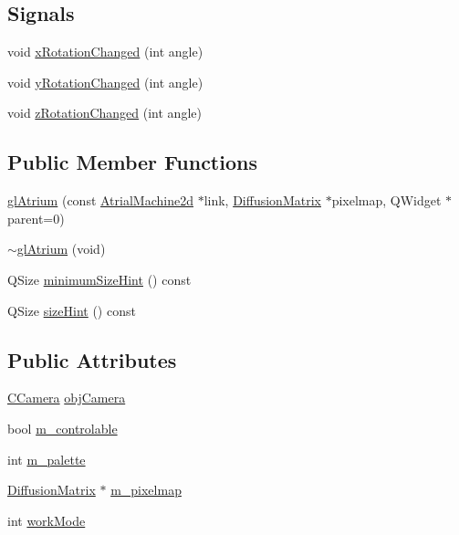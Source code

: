 \subsection*{Signals}
\begin{DoxyCompactItemize}
\item 
void \hyperlink{classgl_atrium_add3c45ba71308914e62ac5f07d9dbce4}{x\+Rotation\+Changed} (int angle)
\item 
void \hyperlink{classgl_atrium_a12abcdbba73ff41ea8efdbbdcdbdcb6c}{y\+Rotation\+Changed} (int angle)
\item 
void \hyperlink{classgl_atrium_a71703a9bcfb404b9aa1bdab789573c7e}{z\+Rotation\+Changed} (int angle)
\end{DoxyCompactItemize}
\subsection*{Public Member Functions}
\begin{DoxyCompactItemize}
\item 
\hyperlink{classgl_atrium_afddd34b3b58c74d8f6095796c766e80b}{gl\+Atrium} (const \hyperlink{class_atrial_machine2d}{Atrial\+Machine2d} $\ast$link, \hyperlink{class_diffusion_matrix}{Diffusion\+Matrix} $\ast$pixelmap, Q\+Widget $\ast$parent=0)
\item 
\hyperlink{classgl_atrium_aab01fe62e0f7734e3b91b42a11d32db7}{$\sim$gl\+Atrium} (void)
\item 
Q\+Size \hyperlink{classgl_atrium_acf3a401dfd3ca09d8dcb36886f306ba9}{minimum\+Size\+Hint} () const 
\item 
Q\+Size \hyperlink{classgl_atrium_a0e7fc813e7c9ae4d47317109815b9705}{size\+Hint} () const 
\end{DoxyCompactItemize}
\subsection*{Public Attributes}
\begin{DoxyCompactItemize}
\item 
\hyperlink{class_c_camera}{C\+Camera} \hyperlink{classgl_atrium_a5c68ba4ba236f29f3f96aded86daf029}{obj\+Camera}
\item 
bool \hyperlink{classgl_atrium_a3d9b6da1e18ad8b6125d64afde32c130}{m\+\_\+controlable}
\item 
int \hyperlink{classgl_atrium_afbce9f1a1572de51914bbf7b574c75ad}{m\+\_\+palette}
\item 
\hyperlink{class_diffusion_matrix}{Diffusion\+Matrix} $\ast$ \hyperlink{classgl_atrium_a594ad841f258f1a022dd813e29600f2e}{m\+\_\+pixelmap}
\item 
int \hyperlink{classgl_atrium_a7f57bee89c32d82bdadcb2ff8e5518a3}{work\+Mode}
\end{DoxyCompactItemize}
